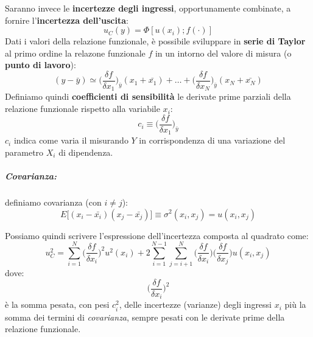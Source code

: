\documentclass[a4paper,11pt]{report}
\begin{document}
Saranno invece le \textbf{incertezze degli ingressi}, opportunamente combinate, a fornire l'\textbf{incertezza dell'uscita}:
$$
  u_C(y) = \Phi[u(x_i);f(\cdotp)]
$$
Dati i valori della relazione funzionale, è possibile sviluppare in \textbf{serie di Taylor} al primo ordine la relazone funzionale $f$ in un intorno del valore di misura (o \textbf{punto di lavoro}):
$$
  (y-\bar{y}) \simeq \Bigg(\frac{\delta f}{\delta x_1}\Bigg)_{\bar{y}} (x_1 + \bar{x_1})+\ldots+\Bigg(\frac{\delta f}{\delta x_N}\Bigg)_{\bar{y}} (x_N + \bar{x_N}) 
$$
Definiamo quindi \textbf{coefficienti di sensibilità} le derivate prime parziali della relazione funzionale rispetto alla variabile $x_i$:
$$
  c_i \equiv \Bigg(\frac{\delta f}{\delta x_1}\Bigg)_{\bar{y}}
$$
$c_i$ indica come varia il misurando $Y$ in corrispondenza di una variazione del parametro $X_i$ di dipendenza.
\subparagraph*{Covarianza:} definiamo covarianza (con $i \ne j$):
$$
  E \Bigg[(x_i - \bar{x_i})(x_j - \bar{x_j})\Bigg] \equiv \sigma^2(x_i,x_j) = u (x_i,x_j)
$$

Possiamo quindi scrivere l'espressione dell'incertezza composta al quadrato come:
$$
  u_C^2 = \sum^N_{i = 1}\Bigg(\frac{\delta f}{\delta x_i}\Bigg)^2 u^2(x_i)+2\sum^{N-1}_{i = 1}\sum^{N}_{j = i +1}\Bigg(\frac{\delta f}{\delta x_i}\Bigg)\Bigg(\frac{\delta f}{\delta x_j}\Bigg)u(x_i,x_j)
$$ dove:
$$
  \Bigg(\frac{\delta f}{\delta x_i}\Bigg)^2
$$
è la somma pesata, con pesi $c_i^2$, delle incertezze (varianze) degli ingressi $x_i$ più la somma dei termini di \textit{covarianza}, sempre pesati con le derivate prime della relazione funzionale.
\end{document}
